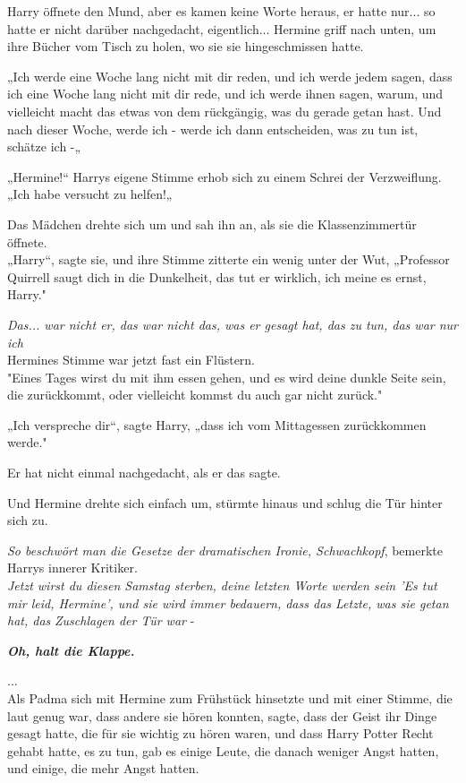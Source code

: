 {Harry öffnete den Mund, aber es kamen keine Worte heraus, er hatte nur... so hatte er nicht darüber nachgedacht, eigentlich... Hermine griff nach unten, um ihre Bücher vom Tisch zu holen, wo sie sie hingeschmissen hatte.

„Ich werde eine Woche lang nicht mit dir reden, und ich werde jedem sagen, dass ich eine Woche lang nicht mit dir rede, und ich werde ihnen sagen, warum, und vielleicht macht das etwas von dem rückgängig, was du gerade getan hast. Und nach dieser Woche, werde ich - werde ich dann entscheiden, was zu tun ist, schätze ich -„

„Hermine!“ Harrys eigene Stimme erhob sich zu einem Schrei der Verzweiflung.\\ „Ich habe versucht zu helfen!„

Das Mädchen drehte sich um und sah ihn an, als sie die Klassenzimmertür öffnete.\\ „Harry“, sagte sie, und ihre Stimme zitterte ein wenig unter der Wut, „Professor Quirrell saugt dich in die Dunkelheit, das tut er wirklich, ich meine es ernst, Harry."

\emph{Das... war nicht er, das war nicht das, was er gesagt hat, das zu tun, das war nur ich}\\ Hermines Stimme war jetzt fast ein Flüstern.\\ "Eines Tages wirst du mit ihm essen gehen, und es wird deine dunkle Seite sein, die zurückkommt, oder vielleicht kommst du auch gar nicht zurück."

„Ich verspreche dir“, sagte Harry, „dass ich vom Mittagessen zurückkommen werde."

Er hat nicht einmal nachgedacht, als er das sagte.

Und Hermine drehte sich einfach um, stürmte hinaus und schlug die Tür hinter sich zu.

\emph{So beschwört man die Gesetze der dramatischen Ironie, Schwachkopf}, bemerkte Harrys innerer Kritiker.\\ \emph{Jetzt wirst du diesen Samstag sterben, deine letzten Worte werden sein 'Es tut mir leid, Hermine', und sie wird immer bedauern, dass das Letzte, was sie getan hat, das} \emph{Zuschlagen der Tür war} -

\textbf{\emph{Oh, halt die Klappe.}}

...\\ Als Padma sich mit Hermine zum Frühstück hinsetzte und mit einer Stimme, die laut genug war, dass andere sie hören konnten, sagte, dass der Geist ihr Dinge gesagt hatte, die für sie wichtig zu hören waren, und dass Harry Potter Recht gehabt hatte, es zu tun, gab es einige Leute, die danach weniger Angst hatten, und einige, die mehr Angst hatten.

}

